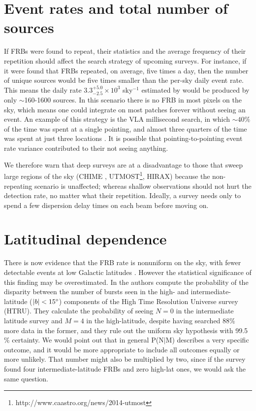 \documentclass[useAMS,usenatbib]{mn2e}
\begin{document}
\section{Event rates and total number of sources}
\label{rate}

If FRBs were found to repeat, their statistics and the
average frequency of their repetition 
should affect the search strategy of upcoming surveys. 
For instance, if it were found that FRBs repeated,
on average, five times a day, then the number of unique 
sources would be five times smaller than the per-sky 
daily event rate. This means the daily rate 
$3.3^{+5.0}_{-2.5}\times10^3$ sky$^{-1}$ estimated by 
\cite{2015arXiv150500834R} would be produced by
only $\sim$160-1600 sources. In this scenario 
there is no FRB in most pixels on the sky, which means
one could integrate on most patches forever without 
seeing an event. An example of this strategy is the VLA millisecond search, 
in which $\sim40\%$ of the time was spent at a single pointing, and
almost three quarters of the time was spent at just three locations \citep{2015ApJ...807...16L}.
It is possible that pointing-to-pointing event rate variance contributed 
to their not seeing anything.

We therefore warn that deep surveys are at a disadvantage 
to those that sweep large regions of the sky 
(CHIME  \citep{2014SPIE.9145E..22B}, 
UTMOST\footnote{http://www.caastro.org/news/2014-utmost}, HIRAX)
because the non-repeating 
scenario is unaffected; whereas shallow observations 
should not hurt the detection rate, no matter what their repetition. 
Ideally, a survey
needs only to spend a few dispersion delay times on each beam 
before moving on. 

\section{Latitudinal dependence}
\label{latitude}
There is now evidence that the FRB rate is nonuniform on the sky, 
with fewer detectable events at low Galactic latitudes \citep{2014ira..book.....B}.
However the statistical significance of this finding may be 
overestimated. In \citep{2014ApJ...789L..26P}
the authors compute the probability of the disparity between the number of 
bursts seen in the high- and intermediate-latitude ($|b| < 15\degree$)
components of the High Time Resolution Universe survey 
(HTRU). They calculate the probability of seeing $N=0$ in the intermediate 
latitude survey and $M=4$ in 
the high-latitude, despite having searched 88$\%$ more data in the former, and they 
rule out the uniform sky hypothesis with 99.5$\%$ certainty. We would point out 
that in general P(N$|$M) describes a very specific outcome, and it would be 
more appropriate to include all outcomes equally or more unlikely.
That number might also be multiplied by two, since if the survey found 
four intermediate-latitude FRBs and zero high-lat ones, we would ask the same 
question. 
\end{document}
